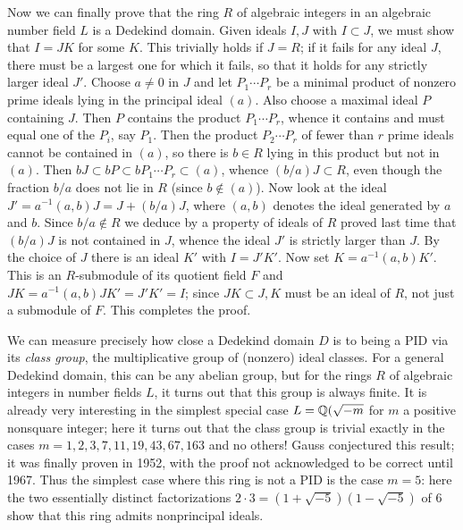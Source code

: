 Now we can finally prove that the ring $R$ of algebraic integers in an algebraic number field $L$ is a Dedekind domain.  Given ideals $I,J$ with $I\subset J$, we must show that $I=JK$ for some $K$.  This trivially holds if $J=R$; if it fails for any ideal $J$, there must be a largest one for which it fails, so that it holds for any strictly larger ideal $J'$.  Choose $a\ne0$ in $J$ and let $P_1\cdots P_r$ be a minimal product of nonzero prime ideals lying in the principal ideal $(a)$.  Also choose a maximal ideal $P$ containing $J$.  Then $P$ contains the product $P_1\cdots P_r$, whence it contains and must equal one of the $P_i$, say $P_1$.  Then the product $P_2\cdots P_r$ of fewer than $r$ prime ideals cannot be contained in $(a)$, so there is $b\in R$ lying in this product but not in $(a)$.  Then
$bJ\subset bP\subset bP_1\cdots P_r\subset (a)$, whence $(b/a)J\subset R$, even though the fraction $b/a$ does not lie in $R$ (since $b\notin (a)$).  Now look at the ideal $J' = a^{-1}(a,b)J =
J + (b/a)J$, where $(a,b)$ denotes the ideal generated by $a$ and $b$.  Since $b/a\notin R$ we deduce by a property of ideals of $R$ proved last time that $(b/a)J$ is not contained in $J$, whence the ideal $J'$ is strictly larger than $J$.  By the choice of $J$ there is an ideal $K'$ with $I=J'K'$.  Now set $K= a^{-1}(a,b)K'$.  This is an $R$-submodule of its quotient field $F$ and $JK = a^{-1}(a,b)JK' =
J'K' = I$; since $JK\subset J, K$ must be an ideal of $R$, not just a submodule of $F$.  This completes the proof.

We can measure precisely how close a Dedekind domain $D$ is to being a PID via its {\sl class group}, the multiplicative group of (nonzero) ideal classes.  For a general Dedekind domain, this can be any abelian group, but for the rings $R$ of algebraic integers in number fields $L$, it turns out that this group is always finite.  It is already very interesting in the simplest special case
$L=\Bbb Q(\sqrt{-m}$ for $m$ a positive nonsquare integer; here it turns out that the class group is trivial exactly in the cases $m = 1,2,3,7,11,19,43,67,163$ and no others!  Gauss conjectured this result; it was finally proven in 1952, with the proof not acknowledged to be correct until 1967.  Thus the simplest case where this ring is not a PID is the case $m=5$:  here the two essentially distinct factorizations $2\cdot 3 = (1+\sqrt{-5})(1-\sqrt{-5})$ of 6 show that this ring admits nonprincipal ideals.

